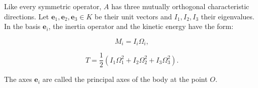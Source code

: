 Like every symmetric operator, $A$ has three mutually orthogonal characteristic directions. Let $\mathbf{e}_1, \mathbf{e}_2, \mathbf{e}_3 \in K$ be their unit vectors and $I_1, I_2, I_3$ their eigenvalues. In the basis $\mathbf{e}_i$, the inertia operator and the kinetic energy have the form:

$$M_i = I_i \Omega_i,$$

$$T = \frac{1}{2}(I_1\Omega_1^2 + I_2\Omega_2^2 + I_3\Omega_3^2).$$

The axes $\mathbf{e}_i$ are called the principal axes of the body at the point $O$.
